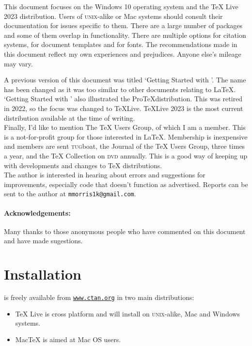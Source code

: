 \documentclass[12pt, a4paper]{article}
\begin{document}
This document focuses on the Windows 10 operating system and the TeX Live 2023 distribution. Users of \textsc{unix}-alike or Mac systems should consult their documentation for issues specific to them. There are a large number of packages and some of them overlap in functionality. There are multiple options for citation systems, for document templates and for fonts. The recommendations made in this document reflect my own experiences and prejudices. Anyone else's mileage may vary.

A previous version of this document was titled `Getting Started with \LaTeXe'. The name has been changed as it was too similar to other documents relating to LaTeX. `Getting Started with \LaTeXe' also illustrated the Pro\TeX distribution. This was retired in 2022, so the focus was changed to \TeX Live. \TeX Live 2023 is the most current distribution available at the time of writing. \\

Finally, I'd like to mention The TeX Users Group, of which I am a member. This is a not-for-profit group for those interested in LaTeX. Membership is inexpensive and members are sent \textsc{tug}boat, the Journal of the TeX Users Group, three times a year, and the TeX Collection on \textsc{dvd} annually. This is a good way of keeping up with developments and changes to TeX distributions. \\

The author is interested in hearing about errors and suggestions for improvements, especially code that doesn't function as advertised. Reports can be sent to the author at \texttt{\color{Blue}mmorris1k@gmail.com}.  

\paragraph{Acknowledgements:}
Many thanks to those anonymous people who have commented on this document and have made sugestions.


\clearpage

\section{Installation}

\LaTeXe is freely available from \texttt{\url{www.ctan.org}} in two main distributions: 


\begin{itemize}
\item TeX Live is cross platform and will install on \textsc{unix}-alike, Mac and Windows systems.\\
	
\item MacTeX is aimed at Mac OS users.\\
	
\end{itemize}
\end{document}
